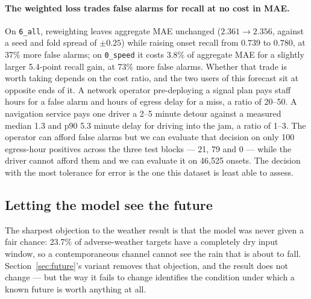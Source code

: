 \documentclass[letterpaper]{article}
\begin{document}
\paragraph{The weighted loss trades false alarms for recall at no cost in MAE.} On \texttt{6\_all}, reweighting leaves aggregate MAE unchanged ($2.361\to2.356$, against a seed and fold spread of $\pm0.25$) while raising onset recall from $0.739$ to $0.780$, at 37\% more false alarms; on \texttt{0\_speed} it costs 3.8\% of aggregate MAE for a slightly larger 5.4-point recall gain, at 73\% more false alarms. Whether that trade is worth taking depends on the cost ratio, and the two users of this forecast sit at opposite ends of it. A network operator pre-deploying a signal plan pays staff hours for a false alarm and hours of egress delay for a miss, a ratio of 20--50. A navigation service pays one driver a 2--5 minute detour against a measured median 1.3 and p90 5.3 minute delay for driving into the jam, a ratio of 1--3. The operator can afford false alarms but we can evaluate that decision on only 100 egress-hour positives across the three test blocks --- 21, 79 and 0 --- while the driver cannot afford them and we can evaluate it on 46{,}525 onsets. The decision with the most tolerance for error is the one this dataset is least able to assess.

\subsection{Letting the model see the future}

The sharpest objection to the weather result is that the model was never given a fair chance: 23.7\% of adverse-weather targets have a completely dry input window, so a contemporaneous channel cannot see the rain that is about to fall. Section~\ref{sec:future}'s variant removes that objection, and the result does not change --- but the way it fails to change identifies the condition under which a known future is worth anything at all.
\end{document}
